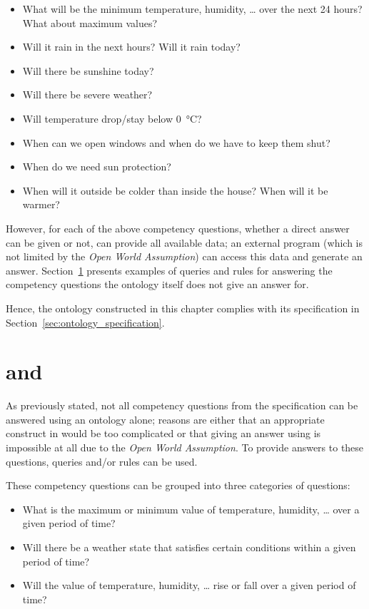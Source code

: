 \begin{itemize}
  \item What will be the minimum temperature, humidity, … over the next 24 hours? What about maximum values?
  \item Will it rain in the next hours? Will it rain today?
  \item Will there be sunshine today?
  \item Will there be severe weather?
  \item Will temperature drop/stay below \SI{0}{\celsius}?
  \item When can we open windows and when do we have to keep them shut?
  \item When do we need sun protection?
  \item When will it outside be colder than inside the house? When will it be warmer?
\end{itemize}

However, for each of the above competency questions, whether a direct answer can be given or not, \smarthomeweather can provide all available data; an external program (which is not limited by the \emph{Open World Assumption}) can access this data and generate an answer. Section~\ref{sec:queries_rules} presents examples of  queries and  rules for answering the competency questions the ontology itself does not give an answer for.

Hence, the ontology constructed in this chapter complies with its specification in Section~\ref{sec:ontology_specification}.

\section{ and }
\label{sec:queries_rules}

As previously stated, not all competency questions from the specification can be answered using an  ontology alone; reasons are either that an appropriate construct in  would be too complicated or that giving an answer using  is impossible at all due to the \emph{Open World Assumption}. To provide answers to these questions,  queries and/or  rules can be used.

These competency questions can be grouped into three categories of questions:
\begin{itemize}
  \item What is the maximum or minimum value of temperature, humidity, … over a given period of time?
  \item Will there be a weather state that satisfies certain conditions within a given period of time?
  \item Will the value of temperature, humidity, … rise or fall over a given period of time?
\end{itemize}

